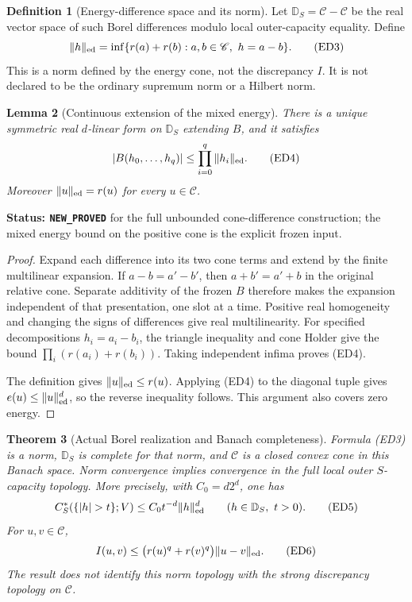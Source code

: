 \documentclass[11pt,a4paper]{article}
\numberwithin{equation}{section}
\newtheorem{theorem}{Theorem}[section]
\newtheorem{lemma}[theorem]{Lemma}
\theoremstyle{definition}
\newtheorem{definition}[theorem]{Definition}
\theoremstyle{remark}
\begin{document}
\begin{definition}[Energy-difference space and its norm]
\label{def:r12-energy-difference}
Let $\mathbb D_S=\mathscr C-\mathscr C$ be the real vector space of
such Borel differences modulo local outer-capacity equality. Define
\[
 \|h\|_{\rm ed}
   =\inf\{r(a)+r(b):a,b\in\mathscr C,\ h=a-b\}.
 \tag{ED3}
\]
This is a norm defined by the energy cone, not the discrepancy $I$.
It is not declared to be the ordinary supremum norm or a Hilbert norm.
\end{definition}

\begin{lemma}[Continuous extension of the mixed energy]
\label{lem:r12-difference-mixed-extension}
There is a unique symmetric real $d$-linear form on $\mathbb D_S$
extending $B$, and it satisfies
\[
       |B(h_0,\ldots,h_q)|\leq\prod_{i=0}^q\|h_i\|_{\rm ed}.
 \tag{ED4}
\]
Moreover $\|u\|_{\rm ed}=r(u)$ for every $u\in\mathscr C$.
\end{lemma}

\noindent\textbf{Status: \texttt{NEW\_PROVED}} for the full
unbounded cone-difference construction; the mixed energy bound on
the positive cone is the explicit frozen input.

\begin{proof}
Expand each difference into its two cone terms and extend by the
finite multilinear expansion. If $a-b=a'-b'$, then
$a+b'=a'+b$ in the original relative cone. Separate additivity of
the frozen $B$ therefore makes the expansion independent of that
presentation, one slot at a time. Positive real homogeneity and
changing the signs of differences give real multilinearity.
For specified decompositions $h_i=a_i-b_i$, the triangle inequality
and cone Holder give the bound $\prod_i(r(a_i)+r(b_i))$.
Taking independent infima proves (ED4).

The definition gives $\|u\|_{\rm ed}\leq r(u)$. Applying (ED4)
to the diagonal tuple gives $e(u)\leq\|u\|_{\rm ed}^{d}$, so the
reverse inequality follows. This argument also covers zero energy.
\end{proof}

\begin{theorem}[Actual Borel realization and Banach completeness]
\label{thm:r12-energy-difference-Banach}
Formula (ED3) is a norm, $\mathbb D_S$ is complete for that norm,
and $\mathscr C$ is a closed convex cone in this Banach space.
Norm convergence implies convergence in the full local outer
$S$-capacity topology. More precisely, with
$C_0=d2^d$, one has
\[
 C_S^*(\{|h|>t\};V)\leq C_0 t^{-d}\|h\|_{\rm ed}^{d}
                    \qquad(h\in\mathbb D_S,\ t>0).
 \tag{ED5}
\]
For $u,v\in\mathscr C$,
\[
 I(u,v)\leq\bigl(r(u)^q+r(v)^q\bigr)\|u-v\|_{\rm ed}.
 \tag{ED6}
\]
The result does not identify this norm topology with the strong
discrepancy topology on $\mathscr C$.
\end{theorem}
\end{document}
